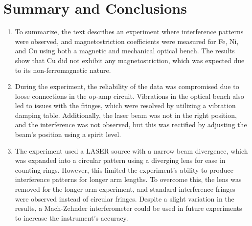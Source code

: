 \chapter{\label{summary}Summary and Conclusions}
\begin{enumerate}
	\item To summarize, the text describes an experiment where interference patterns were observed, and magnetostriction coefficients were measured for Fe, Ni, and Cu using both a magnetic and mechanical optical bench. The results show that Cu did not exhibit any magnetostriction, which was expected due to its non-ferromagnetic nature.
	\item During the experiment, the reliability of the data was compromised due to loose connections in the op-amp circuit. Vibrations in the optical bench also led to issues with the fringes, which were resolved by utilizing a vibration damping table. Additionally, the laser beam was not in the right position, and the interference was not observed, but this was rectified by adjusting the beam's position using a spirit level.
	\item The experiment used a LASER source with a narrow beam divergence, which was expanded into a circular pattern using a diverging lens for ease in counting rings. However, this limited the experiment's ability to produce interference patterns for longer arm lengths. To overcome this, the lens was removed for the longer arm experiment, and standard interference fringes were observed instead of circular fringes. Despite a slight variation in the results, a Mach-Zehnder interferometer could be used in future experiments to increase the instrument's accuracy.
\end{enumerate}

\setcounter{equation}{0}
\setcounter{table}{0}
\setcounter{figure}{0}


    



